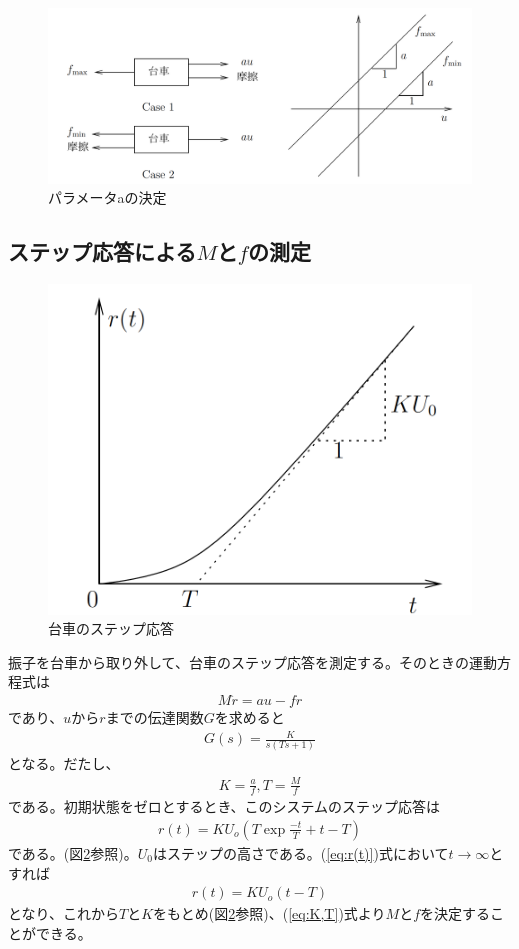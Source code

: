 \documentclass[a4j,11pt,twoside]{ujbook}
\begin{document}
\begin{figure}[htbp]
	\begin{center}
		\includegraphics[width = 0.8 \linewidth]{definition_a.png}
		\caption{パラメータaの決定}
		\label{fig:パラメータaの決定}
	\end{center}
\end{figure}

\subsection{ステップ応答による$M$と$f$の測定}

\begin{figure}[htbp]
	\begin{center}
		\includegraphics[width = 0.6 \linewidth]{cart_step.png}
		\caption{台車のステップ応答}
		\label{fig:台車のステップ応答}
	\end{center}
\end{figure}

振子を台車から取り外して、台車のステップ応答を測定する。そのときの運動方程式は
\begin{eqnarray}
	M\ddot{r} = au - fr
\end{eqnarray}
であり、$u$から$r$までの伝達関数$G$を求めると
\begin{eqnarray}
	G(s) = \frac{K}{s(Ts+1)}
\end{eqnarray}
となる。だたし、
\begin{eqnarray}
K = \frac{a}{f},T = \frac{M}{f}
\label{eq:K,T}
\end{eqnarray}
である。初期状態をゼロとするとき、このシステムのステップ応答は
\begin{eqnarray}
r(t) = KU_o(T\exp{\frac{-t}{T}}+t-T)
\label{eq:r(t)}
\end{eqnarray}
である。(図\ref{fig:台車のステップ応答}参照)。$U_0$はステップの高さである。(\ref{eq:r(t)})式において$t→∞$とすれば
\begin{eqnarray}
r(t) = KU_o(t-T)
\end{eqnarray}
となり、これから$T$と$K$をもとめ(図\ref{fig:台車のステップ応答}参照)、(\ref{eq:K,T})式より$M$と$f$を決定することができる。
\end{document}
